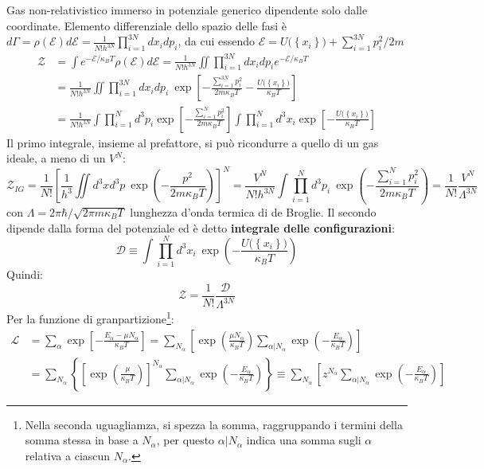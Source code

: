 \documentclass[10pt, a4paper]{scrartcl}
\numberwithin{equation}{subsection}
\theoremstyle{style1}
\begin{document}
Gas non-relativistico immerso in potenziale generico dipendente solo dalle coordinate. Elemento differenziale dello spazio delle fasi \`e $d\Gamma = \rho (\mathscr{E}) d \mathscr{E} = \frac{1}{N!h^{3N} } \prod_{i=1} ^{3N} dx_i dp_i$, da cui essendo $\mathscr{E} = U\big(\left\{ x_i \right\} \big) + \sum_{i=1}^{3N} p_i^2 / 2m$
\[
	\begin{split}
	\mathscr{Z} &= \int e^{- \mathscr{E} / \kappa _B T}  \rho (\mathscr{E}) d \mathscr{E} = \frac{1}{N! h^{3N} }\iint \prod_{i=1} ^{3N} dx_i dp_i e^{- \mathscr{E} / \kappa _B T} \\
			    &= \frac{1}{N! h^{3N} } \iint \prod_{i=1} ^{3N} dx_i dp_i \ \exp \left[ - \frac{\sum_{i=1}^{3N} p_i^2}{2m\kappa _B T} - \frac{U \big(\left\{ x_i \right\} \big)}{\kappa _BT} \right] \\
			    &=\frac{1}{N! h^{3N} } \int \prod _{i=1} ^N d^3 p_i \exp \left[ - \frac{\sum_{i=1}^{N} p_i  ^2}{2m \kappa _B T} \right] \int \prod_{i=1} ^N d^3 x_i \exp\left[ - \frac{U\big(\left\{ x_i \right\} \big)}{\kappa _B T} \right] 
	\end{split}
\] 
Il primo integrale, insieme al prefattore, si pu\`o ricondurre a quello di un gas ideale, a meno di un $V^N$:
\[
		\mathscr{Z}_{IG}= \frac{1}{N!} \left[ \frac{1}{h^3} \iint d^3 x d^3 p \ \exp \left( - \frac{p^2}{2m\kappa _B T } \right) \right] ^N= \frac{V^N}{N! h^{3N} } \int \prod_{i=1} ^N d^3 p_i \ \exp \left(-\frac{\sum_{i=1}^{N} p_i^2}{2m\kappa _BT}\right) = \frac{1}{N!} \frac{V^N}{\Lambda ^{3N} }
\] 
con $\Lambda = 2\pi \hbar /\sqrt{2\pi m\kappa _B T} $ lunghezza d'onda termica di de Broglie. Il secondo dipende dalla forma del potenziale ed \`e detto \textbf{integrale delle configurazioni}:
\begin{equation}
	\mathscr{D} \equiv \int \prod_{i=1} ^N	d^3 x_i \ \exp \left(- \frac{U\big(\left\{ x_i \right\} \big)}{\kappa _BT}\right) 
\end{equation}
Quindi:
\begin{equation}
\mathscr{Z} = \frac{1}{N!} \frac{\mathscr{D}}{\Lambda ^{3N} }
\end{equation}
Per la funzione di granpartizione\footnote{Nella seconda uguagliamza, si spezza la somma, raggruppando i termini della somma stessa in base a $N_\alpha $, per questo $\alpha | N_\alpha $ indica una somma sugli $\alpha $ relativa a ciascun $N_\alpha $.}:
\begin{equation}
	\begin{split}
		\mathscr{L} &= \sum_{\alpha }^{} \exp \left[ - \frac{E_\alpha  - \mu  N_\alpha }{\kappa _B T} \right] = \sum_{N_\alpha }^{} \left[ \exp \left(\frac{\mu N_\alpha }{\kappa _B T}\right) \sum_{\alpha | N_\alpha }^{} \exp \left(- \frac{E_\alpha }{\kappa _B T}\right)  \right] \\
			    & =\sum_{N_\alpha }^{} \left\{ \left[ \exp \left(\frac{\mu }{\kappa _BT}\right)  \right] ^{N_\alpha } \sum_{\alpha | N_\alpha }^{} \exp \left(-\frac{E_\alpha }{\kappa _BT}\right)  \right\} \equiv \sum_{N_\alpha }^{} \left[ z^{N_\alpha } \sum_{\alpha | N_\alpha }^{} \exp\left(- \frac{E_\alpha }{\kappa _BT}\right)  \right] 
	\end{split}
\end{equation}
\end{document}
